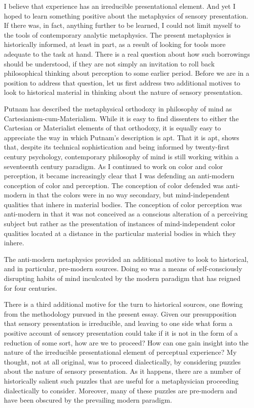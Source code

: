 I believe that experience has an irreducible presentational element. And yet I hoped to learn something positive about the metaphysics of sensory presentation. If there was, in fact, anything further to be learned, I could not limit myself to the tools of contemporary analytic metaphysics. The present metaphysics is historically informed, at least in part, as a result of looking for tools more adequate to the task at hand. There is a real question about how such borrowings should be understood, if they are not simply an invitation to roll back philosophical thinking about perception to some earlier period. Before we are in a position to address that question, let us first address two additional motives to look to historical material in thinking about the nature of sensory presentation.

Putnam has described the metaphysical orthodoxy in philosophy of mind as Cartesianism-cum-Materialism. While it is easy to find dissenters to either the Cartesian or Materialist elements of that orthodoxy, it is equally easy to appreciate the way in which Putnam's description is apt. That it is apt, shows that, despite its technical sophistication and being informed by twenty-first century psychology, contemporary philosophy of mind is still working within a seventeenth century paradigm. As I continued to work on color and color perception, it became increasingly clear that I was defending an anti-modern conception of color and perception. The conception of color defended was anti-modern in that the colors were in no way secondary, but mind-independent qualities that inhere in material bodies. The conception of color perception was anti-modern in that it was not conceived as a conscious alteration of a perceiving subject but rather as the presentation of instances of mind-independent color qualities located at a distance in the particular material bodies in which they inhere.

The anti-modern metaphysics provided an additional motive to look to historical, and in particular, pre-modern sources. Doing so was a means of self-consciously disrupting habits of mind inculcated by the modern paradigm that has reigned for four centuries. 

There is a third additional motive for the turn to historical sources, one flowing from the methodology pursued in the present essay. Given our presupposition that sensory presentation is irreducible, and leaving to one side what form a positive account of sensory presentation could take if it is not in the form of a reduction of some sort, how are we to proceed? How can one gain insight into the nature of the irreducible presentational element of perceptual experience? My thought, not at all original, was to proceed dialectically, by considering puzzles about the nature of sensory presentation. As it happens, there are a number of historically salient such puzzles that are useful for a metaphysician proceeding dialectically to consider. Moreover, many of these puzzles are pre-modern and have been obscured by the prevailing modern paradigm.

